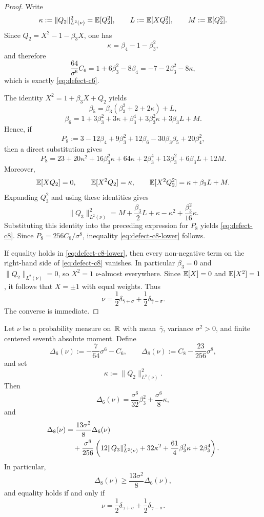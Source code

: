 \begin{proof}
Write
\[
\kappa:=\|Q_2\|_{L^2(\nu)}^2=\mathbb{E}[Q_2^2],
\qquad
L:=\mathbb{E}[XQ_2^2],
\qquad
M:=\mathbb{E}[Q_2^3].
\]
Since $Q_2=X^2-1-\beta_3X$, one has
\[
\kappa=\beta_4-1-\beta_3^2,
\]
and therefore
\[
\frac{64}{\sigma^6}C_6
=1+6\beta_3^2-8\beta_4
=-7-2\beta_3^2-8\kappa,
\]
which is exactly \eqref{eq:defect-c6}.

The identity $X^2=1+\beta_3X+Q_2$ yields
\[
\beta_5=\beta_3(\beta_3^2+2+2\kappa)+L,
\]
\[
\beta_6=1+3\beta_3^2+3\kappa+\beta_3^4+3\beta_3^2\kappa+3\beta_3L+M.
\]
Hence, if
\[
P_8:=3-12\beta_4+9\beta_3^2+12\beta_6-30\beta_3\beta_5+20\beta_4^2,
\]
then a direct substitution gives
\[
P_8
=23+20\kappa^2+16\beta_3^2\kappa+64\kappa+2\beta_3^4+13\beta_3^2+6\beta_3L+12M.
\]
Moreover,
\[
\mathbb{E}[XQ_2]=0,\qquad
\mathbb{E}[X^2Q_2]=\kappa,\qquad
\mathbb{E}[X^2Q_2^2]=\kappa+\beta_3L+M.
\]
Expanding $Q_3^2$ and using these identities gives
\[
\|Q_3\|_{L^2(\nu)}^2
=M+\frac{\beta_3}{2}L+\kappa-\kappa^2+\frac{\beta_3^2}{16}\kappa.
\]
Substituting this identity into the preceding expression for $P_8$
yields \eqref{eq:defect-c8}.  Since
$P_8=256C_8/\sigma^8$, inequality \eqref{eq:defect-c8-lower} follows.

If equality holds in \eqref{eq:defect-c8-lower}, then every non-negative
term on the right-hand side of \eqref{eq:defect-c8} vanishes.  In
particular $\beta_3=0$ and $\|Q_2\|_{L^2(\nu)}=0$, so $X^2=1$
$\nu$-almost everywhere.  Since $\mathbb{E}[X]=0$ and $\mathbb{E}[X^2]=1$, it follows
that $X=\pm 1$ with equal weights.  Thus
\[
\nu=\frac12\delta_{\bar\gamma+\sigma}
+\frac12\delta_{\bar\gamma-\sigma}.
\]
The converse is immediate.
\end{proof}

\begin{theorem}\label{thm:poisson-defect-amplification}
Let $\nu$ be a probability measure on~$\mathbb{R}$ with mean~$\bar\gamma$,
variance $\sigma^2>0$, and finite centered seventh absolute moment.  Define
\[
\Delta_6(\nu):=-\frac{7}{64}\sigma^6-C_6,
\qquad
\Delta_8(\nu):=C_8-\frac{23}{256}\sigma^8,
\]
and set
\[
\kappa:=\|Q_2\|_{L^2(\nu)}^2.
\]
Then
\[
\Delta_6(\nu)
=\frac{\sigma^6}{32}\beta_3^2+\frac{\sigma^6}{8}\kappa,
\]
and
\begin{align}
\Delta_8(\nu)
&=
\frac{13\sigma^2}{8}\Delta_6(\nu)
\notag\\
&\quad
+\frac{\sigma^8}{256}\left(
12\|Q_3\|_{L^2(\nu)}^2
+32\kappa^2
+\frac{61}{4}\beta_3^2\kappa
+2\beta_3^4
\right). \label{eq:defect-amplification}
\end{align}
In particular,
\[
\Delta_8(\nu)\ge \frac{13\sigma^2}{8}\Delta_6(\nu),
\]
and equality holds if and only if
\[
\nu=\frac12\delta_{\bar\gamma+\sigma}
+\frac12\delta_{\bar\gamma-\sigma}.
\]
\end{theorem}

